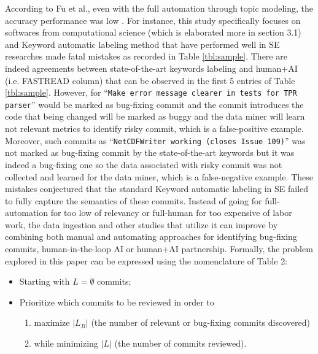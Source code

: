 \documentclass[10pt,conference]{IEEEtran}
\newcommand{\bi}{\begin{itemize}[leftmargin=0.4cm]}
\newcommand{\ei}{\end{itemize}}
\begin{document}
According to Fu et al., even with the full automation through topic modeling, the accuracy performance was low \cite{fu05committopic}. For instance, this study specifically focuses on softwares from computational science (which is elaborated more in section 3.1) and Keyword automatic labeling method that have performed well in SE researches \cite{commitguru, nayrolles18_clever, Kim08changes, kamei12_jit} made fatal mistakes as recorded in Table \ref{tbl:sample}. There are indeed agreements between state-of-the-art keywords labeling and human+AI (i.e. FASTREAD column) that can be observed in the first 5 entries of Table \ref{tbl:sample}. However, for ``\texttt{Make error message clearer in tests for TPR parser}'' would be marked as bug-fixing commit and the commit introduces the code that being changed will be marked as buggy and the data miner will learn not relevant metrics to identify risky commit, which is a false-positive example. Moreover, such commits as ``\texttt{NetCDFWriter working (closes Issue 109)}'' was not marked as bug-fixing commit by the state-of-the-art keywords but it was indeed a bug-fixing one so the data associated with risky commit was not collected and learned for the data miner, which is a false-negative example. These mistakes conjectured that the standard Keyword automatic labeling in SE failed to fully capture the semantics of these commits. Instead of going for full-automation for too low of relevancy or full-human for too expensive of labor work, the data ingestion and other studies \cite{costa17szz, Kim08changes, nayrolles18_clever, catolino17_jitmobile, kamei12_jit, kamei12_jit} that utilize it can improve by combining both manual and automating approaches for identifying bug-fixing commits, human-in-the-loop AI or human+AI partnership. Formally, the problem explored in this paper can be expressed using the nomenclature of Table 2:
\bi
\item Starting with $L = \emptyset$ commits;
\item Prioritize which commits to be reviewed in order to 
\begin{enumerate}
    \item maximize $|L_{R}|$ (the number of relevant or bug-fixing commits discovered)
    \item while minimizing $|L|$ (the number of commits reviewed).
\end{enumerate}
\ei
\end{document}
